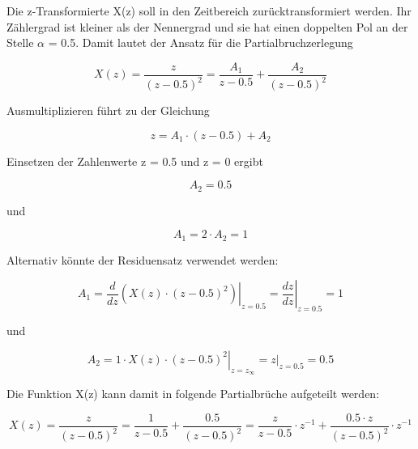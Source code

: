 \noindent Die z-Transformierte X(z) soll in den Zeitbereich zur\"{u}cktransformiert werden. Ihr Z\"{a}hlergrad ist kleiner als der Nennergrad und sie hat einen doppelten Pol an der Stelle $\alpha$ = 0.5. Damit lautet der Ansatz f\"{u}r die Partialbruchzerlegung

\begin{equation}\label{eq:fiveonehundredseven}
X\left(z\right)=\frac{z}{\left(z-0.5\right)^{2} } =\frac{A_{1} }{z-0.5} +\frac{A_{2} }{\left(z-0.5\right)^{2} }
\end{equation}

\noindent Ausmultiplizieren f\"{u}hrt zu der Gleichung

\begin{equation}\label{eq:fiveonehundredeight}
z=A_{1} \cdot \left(z-0.5\right)+A_{2} 
\end{equation}

\noindent Einsetzen der Zahlenwerte z = 0.5 und z = 0 ergibt

\begin{equation}\label{eq:fiveonehundrednine}
A_{2} =0.5
\end{equation}

\noindent und 

\begin{equation}\label{eq:fiveonehundredten}
A_{1} =2\cdot A_{2} =1
\end{equation}

\noindent Alternativ k\"{o}nnte der Residuensatz verwendet werden:

\begin{equation}\label{eq:fiveonehundredeleven}
A_{1} =\frac{d}{dz} \left. \left(X\left(z\right)\cdot \left(z-0.5\right)^{2} \right)\right|_{z=0.5} =\left. \frac{dz}{dz} \right|_{z=0.5} =1
\end{equation}

\noindent und 

\begin{equation}\label{eq:fiveonehundredtwelve}
A_{2} =1\cdot \left. X\left(z\right)\cdot \left(z-0.5\right)^{2} \right|_{z=z_{\infty } } =\left. z\right|_{z=0.5} =0.5
\end{equation}

\noindent Die Funktion X(z) kann damit in folgende Partialbr\"{u}che aufgeteilt werden:

\begin{equation}\label{eq:fiveonehundredthirteen}
X\left(z\right)=\frac{z}{\left(z-0.5\right)^{2} } =\frac{1}{z-0.5} +\frac{0.5}{\left(z-0.5\right)^{2} } =\frac{z}{z-0.5} \cdot z^{-1} +\frac{0.5\cdot z}{\left(z-0.5\right)^{2} } \cdot z^{-1}
\end{equation}

